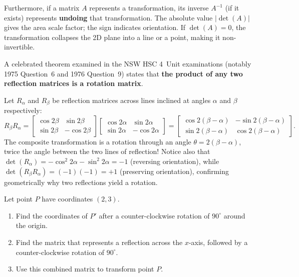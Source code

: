 Furthermore, if a matrix $A$ represents a transformation, its inverse $A^{-1}$ (if it exists) represents \textbf{undoing} that transformation. The absolute value $|\det(A)|$ gives the area scale factor; the sign indicates orientation. If $\det(A) = 0$, the transformation collapses the 2D plane into a line or a point, making it non-invertible.

\begin{remark}
A celebrated theorem examined in the NSW HSC 4~Unit examinations (notably 1975 Question~6 and 1976 Question~9) states that \textbf{the product of any two reflection matrices is a rotation matrix}.

Let $R_\alpha$ and $R_\beta$ be reflection matrices across lines inclined at angles $\alpha$ and $\beta$ respectively:
\[
R_\beta R_\alpha = \begin{bmatrix} \cos 2\beta & \sin 2\beta \\ \sin 2\beta & -\cos 2\beta \end{bmatrix} \begin{bmatrix} \cos 2\alpha & \sin 2\alpha \\ \sin 2\alpha & -\cos 2\alpha \end{bmatrix} = \begin{bmatrix} \cos 2(\beta - \alpha) & -\sin 2(\beta - \alpha) \\ \sin 2(\beta - \alpha) & \cos 2(\beta - \alpha) \end{bmatrix}.
\]
The composite transformation is a rotation through an angle $\theta = 2(\beta - \alpha)$, twice the angle between the two lines of reflection! Notice also that $\det(R_\alpha) = -\cos^2 2\alpha - \sin^2 2\alpha = -1$ (reversing orientation), while $\det(R_\beta R_\alpha) = (-1)(-1) = +1$ (preserving orientation), confirming geometrically why two reflections yield a rotation.
\end{remark}

\bigskip

\begin{problem}
Let point $P$ have coordinates $(2, 3)$. 
\begin{enumerate}[label=\textbf{(\alph*)}]
    \item Find the coordinates of $P'$ after a counter-clockwise rotation of $90^\circ$ around the origin.
    \item Find the matrix that represents a reflection across the $x$-axis, followed by a counter-clockwise rotation of $90^\circ$.
    \item Use this combined matrix to transform point $P$.
\end{enumerate}
\end{problem}

